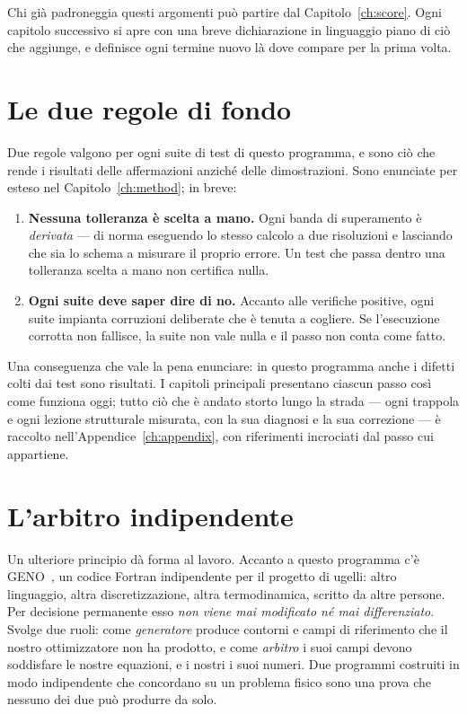 Chi già padroneggia questi argomenti può partire dal
Capitolo~\ref{ch:score}. Ogni capitolo successivo si apre con una
breve dichiarazione in linguaggio piano di ciò che aggiunge, e
definisce ogni termine nuovo là dove compare per la prima volta.

\section{Le due regole di fondo}

Due regole valgono per ogni suite di test di questo programma, e
sono ciò che rende i risultati delle affermazioni anziché delle
dimostrazioni. Sono enunciate per esteso nel
Capitolo~\ref{ch:method}; in breve:

\begin{enumerate}[itemsep=2pt]
\item \textbf{Nessuna tolleranza è scelta a mano.} Ogni banda di
  superamento è \emph{derivata} --- di norma eseguendo lo stesso
  calcolo a due risoluzioni e lasciando che sia lo schema a misurare
  il proprio errore. Un test che passa dentro una tolleranza scelta
  a mano non certifica nulla.
\item \textbf{Ogni suite deve saper dire di no.} Accanto alle
  verifiche positive, ogni suite impianta corruzioni deliberate che
  è tenuta a cogliere. Se l'esecuzione corrotta non fallisce, la
  suite non vale nulla e il passo non conta come fatto.
\end{enumerate}

Una conseguenza che vale la pena enunciare: in questo programma
anche i difetti colti dai test sono risultati. I capitoli principali
presentano ciascun passo così come funziona oggi; tutto ciò che è
andato storto lungo la strada --- ogni trappola e ogni lezione
strutturale misurata, con la sua diagnosi e la sua correzione --- è
raccolto nell'Appendice~\ref{ch:appendix}, con riferimenti incrociati
dal passo cui appartiene.

\section{L'arbitro indipendente}

Un ulteriore principio dà forma al lavoro. Accanto a questo
programma c'è GENO~\cite{geno}, un codice Fortran indipendente per
il progetto di ugelli: altro linguaggio, altra discretizzazione,
altra termodinamica, scritto da altre persone. Per decisione
permanente esso \emph{non viene mai modificato né mai
differenziato}. Svolge due ruoli: come \emph{generatore} produce
contorni e campi di riferimento che il nostro ottimizzatore non ha
prodotto, e come \emph{arbitro} i suoi campi devono soddisfare le
nostre equazioni, e i nostri i suoi numeri. Due programmi costruiti
in modo indipendente che concordano su un problema fisico sono una
prova che nessuno dei due può produrre da solo.

